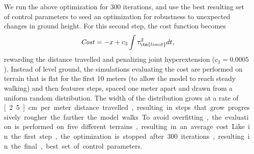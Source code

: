 We run the above optimization for 300 iterations, and use the best resulting set
of control parameters to seed an optimization for robustness to unexpected
changes in ground height. For this second step, the cost function becomes
\begin{align}
    \mathit{Cost} = -x + c_3 \int \tau_\tn{limit}^2 dt ,
\end{align}
rewarding the distance travelled and penalizing joint hyperextension ($c_3 =
0.0005$). Instead of level ground, the simulations evaluating the cost are
performed on terrain that is flat for the first 10 meters (to allow the model to
reach steady walking) and then features steps, spaced one meter apart and drawn
from a uniform random distribution. The width of the distribution grows at a
rate of \unit[2.5]{cm} per meter distance travelled, resulting in steps that
grow progressively rougher the farther the model walks. To avoid overfitting,
the evaluation is performed on five different terrains, resulting in an average
cost. Like in the first step, the optimization is stopped after 300 iterations,
resulting in the final, best set of control parameters.
